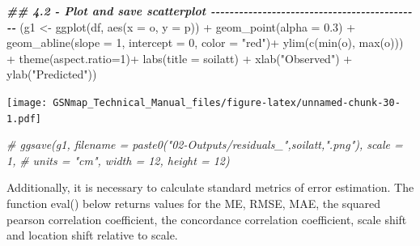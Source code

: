 \documentclass[
  10pt,
  b5paper,
  oneside]{book}
\newenvironment{Shaded}{\begin{snugshade}}{\end{snugshade}}
\newcommand{\AttributeTok}[1]{\textcolor[rgb]{0.77,0.63,0.00}{#1}}
\newcommand{\CommentTok}[1]{\textcolor[rgb]{0.56,0.35,0.01}{\textit{#1}}}
\newcommand{\DecValTok}[1]{\textcolor[rgb]{0.00,0.00,0.81}{#1}}
\newcommand{\DocumentationTok}[1]{\textcolor[rgb]{0.56,0.35,0.01}{\textbf{\textit{#1}}}}
\newcommand{\FloatTok}[1]{\textcolor[rgb]{0.00,0.00,0.81}{#1}}
\newcommand{\FunctionTok}[1]{\textcolor[rgb]{0.00,0.00,0.00}{#1}}
\newcommand{\NormalTok}[1]{#1}
\newcommand{\OtherTok}[1]{\textcolor[rgb]{0.56,0.35,0.01}{#1}}
\newcommand{\SpecialCharTok}[1]{\textcolor[rgb]{0.00,0.00,0.00}{#1}}
\newcommand{\StringTok}[1]{\textcolor[rgb]{0.31,0.60,0.02}{#1}}
\begin{document}
\begin{Shaded}
\begin{Highlighting}[]
  \DocumentationTok{\#\# 4.2 {-} Plot and save scatterplot {-}{-}{-}{-}{-}{-}{-}{-}{-}{-}{-}{-}{-}{-}{-}{-}{-}{-}{-}{-}{-}{-}{-}{-}{-}{-}{-}{-}{-}{-}{-}{-}{-}{-}{-}{-}{-}{-}{-}{-}{-}{-}{-}{-}{-} }
\NormalTok{  (g1 }\OtherTok{\textless{}{-}} \FunctionTok{ggplot}\NormalTok{(df, }\FunctionTok{aes}\NormalTok{(}\AttributeTok{x =}\NormalTok{ o, }\AttributeTok{y =}\NormalTok{ p)) }\SpecialCharTok{+} 
     \FunctionTok{geom\_point}\NormalTok{(}\AttributeTok{alpha =} \FloatTok{0.3}\NormalTok{) }\SpecialCharTok{+} 
     \FunctionTok{geom\_abline}\NormalTok{(}\AttributeTok{slope =} \DecValTok{1}\NormalTok{, }\AttributeTok{intercept =} \DecValTok{0}\NormalTok{, }\AttributeTok{color =} \StringTok{"red"}\NormalTok{)}\SpecialCharTok{+}
     \FunctionTok{ylim}\NormalTok{(}\FunctionTok{c}\NormalTok{(}\FunctionTok{min}\NormalTok{(o), }\FunctionTok{max}\NormalTok{(o))) }\SpecialCharTok{+} \FunctionTok{theme}\NormalTok{(}\AttributeTok{aspect.ratio=}\DecValTok{1}\NormalTok{)}\SpecialCharTok{+} 
     \FunctionTok{labs}\NormalTok{(}\AttributeTok{title =}\NormalTok{ soilatt) }\SpecialCharTok{+} 
     \FunctionTok{xlab}\NormalTok{(}\StringTok{"Observed"}\NormalTok{) }\SpecialCharTok{+} \FunctionTok{ylab}\NormalTok{(}\StringTok{"Predicted"}\NormalTok{))}
\end{Highlighting}
\end{Shaded}

\texttt{[image: GSNmap\_Technical\_Manual\_files/figure-latex/unnamed-chunk-30-1.pdf]}

\begin{Shaded}
\begin{Highlighting}[]
  \CommentTok{\# ggsave(g1, filename = paste0("02{-}Outputs/residuals\_",soilatt,".png"), scale = 1,}
  \CommentTok{\#        units = "cm", width = 12, height = 12)}
\end{Highlighting}
\end{Shaded}

Additionally, it is necessary to calculate standard metrics of error estimation. The function eval() below returns values for the ME, RMSE, MAE, the squared pearson correlation coefficient, the concordance correlation coefficient, scale shift and location shift relative to scale.

\begin{Shaded}
\end{Shaded}
\end{document}
